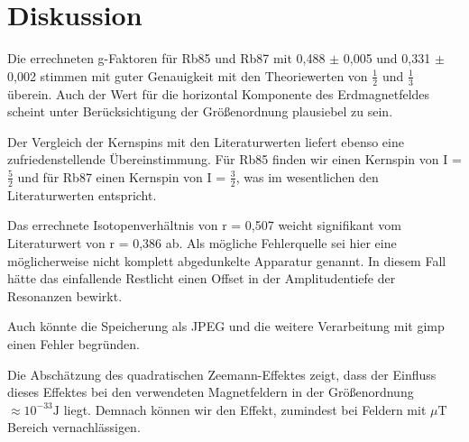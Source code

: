 \section{Diskussion}
Die errechneten g-Faktoren für Rb85 und Rb87 mit 0,488 $\pm$ 0,005 und
0,331 $\pm$ 0,002 stimmen mit guter Genauigkeit mit den Theoriewerten von $\frac{1}{2}$ und $\frac{1}{3}$ überein.
Auch der Wert für die horizontal Komponente des Erdmagnetfeldes scheint unter Berücksichtigung der Größenordnung plausiebel zu sein.

Der Vergleich der Kernspins mit den Literaturwerten liefert ebenso eine zufriedenstellende Übereinstimmung.
Für Rb85 finden wir einen Kernspin von  I = $\frac{5}{2}$ und für Rb87 einen Kernspin von I = $\frac{3}{2}$, was im wesentlichen den
Literaturwerten entspricht.

Das errechnete Isotopenverhältnis von r = 0,507 weicht signifikant vom Literaturwert von r = 0,386 ab. Als mögliche Fehlerquelle
sei hier eine möglicherweise nicht komplett abgedunkelte Apparatur genannt. In diesem Fall hätte das einfallende Restlicht
einen Offset in der Amplitudentiefe der Resonanzen bewirkt.

Auch könnte die Speicherung als JPEG und die weitere Verarbeitung mit gimp einen Fehler begründen.

Die Abschätzung des quadratischen Zeemann-Effektes zeigt, dass der Einfluss dieses Effektes bei den verwendeten Magnetfeldern in der
Größenordnung $\approx 10^{-33} \text{J}$ liegt. Demnach können wir den Effekt, zumindest bei Feldern mit $\mu$T Bereich vernachlässigen.

\printbibliography
